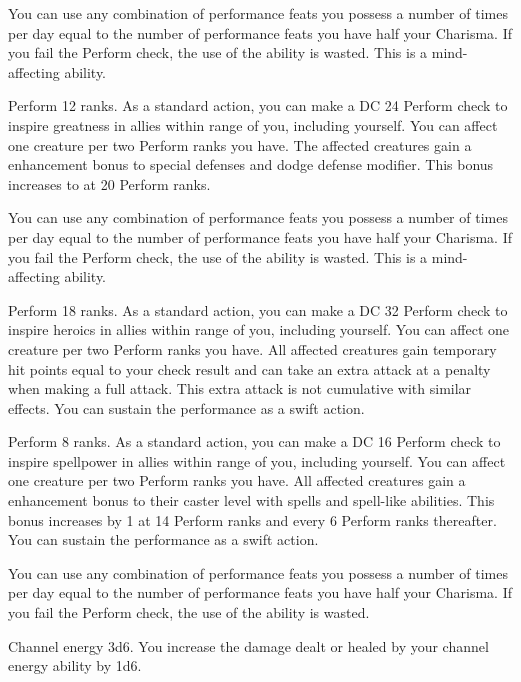 You can use any combination of performance feats you possess a number of times per day equal to the number of performance feats you have \add half your Charisma. If you fail the Perform check, the use of the ability is wasted. This is a mind-affecting ability.

\featpre Perform 12 ranks.
\featben As a standard action, you can make a DC 24 Perform check to inspire greatness in allies within \rngmed range of you, including yourself. You can affect one creature per two Perform ranks you have. The affected creatures gain a  enhancement bonus to special defenses and dodge defense modifier. This bonus increases to  at 20 Perform ranks.

You can use any combination of performance feats you possess a number of times per day equal to the number of performance feats you have \add half your Charisma. If you fail the Perform check, the use of the ability is wasted. This is a mind-affecting ability.

\featpre Perform 18 ranks.
\featben As a standard action, you can make a DC 32 Perform check to inspire heroics in allies within \rngmed range of you, including yourself. You can affect one creature per two Perform ranks you have. All affected creatures gain temporary hit points equal to your check result and can take an extra attack at a  penalty when making a full attack. This extra attack is not cumulative with similar effects. You can sustain the performance as a swift action.

\featpre Perform 8 ranks.
\featben As a standard action, you can make a DC 16 Perform check to inspire spellpower in allies within \rngmed range of you, including yourself. You can affect one creature per two Perform ranks you have. All affected creatures gain a  enhancement bonus to their caster level with spells and spell-like abilities. This bonus increases by 1 at 14 Perform ranks and every 6 Perform ranks thereafter. You can sustain the performance as a swift action.

You can use any combination of performance feats you possess a number of times per day equal to the number of performance feats you have \add half your Charisma. If you fail the Perform check, the use of the ability is wasted.

 Channel energy 3d6.
 You increase the damage dealt or healed by your channel energy ability by 1d6.

